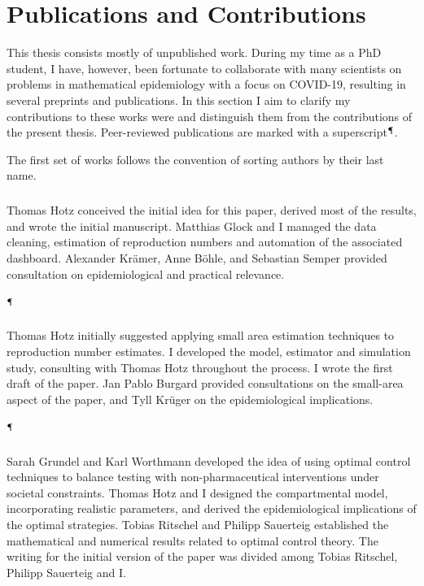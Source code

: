 
\chapter*{Publications and Contributions}
\begin{refsection}[ownpubs]
This thesis consists mostly of unpublished work. 
During my time as a PhD student, I have, however, been fortunate to collaborate with many scientists on problems in mathematical epidemiology with a focus on COVID-19, resulting in several preprints and publications.
In this section I aim to clarify my contributions to these works were and distinguish them from the contributions of the present thesis. Peer-reviewed publications are marked with a superscript$^{\mathparagraph}$.

The first set of works follows the convention of sorting authors by their last name.


\paragraph{\cite{Hotz2020Monitoring}}
Thomas Hotz conceived the initial idea for this paper, derived most of the results, and wrote the initial manuscript. Matthias Glock and I managed the data cleaning, estimation of reproduction numbers and automation of the associated dashboard. Alexander Krämer, Anne Böhle, and Sebastian Semper provided consultation on epidemiological and practical relevance. 

\paragraph{\cite{Burgard2021Regional}$^{\mathparagraph}$}
Thomas Hotz initially suggested applying small area estimation techniques to reproduction number estimates. I developed the model, estimator and simulation study, consulting with Thomas Hotz throughout the process. I wrote the first draft of the paper. Jan Pablo Burgard provided consultations on the small-area aspect of the paper, and Tyll Krüger on the epidemiological implications.

\paragraph{\cite{Grundel2022How}$^{\mathparagraph}$}
Sarah Grundel and Karl Worthmann developed the idea of using optimal control techniques to balance testing with non-pharmaceutical interventions under societal constraints.
Thomas Hotz and I designed the compartmental model, incorporating realistic parameters, and derived the epidemiological implications of the optimal strategies. 
Tobias Ritschel and Philipp Sauerteig established the mathematical and numerical results related to optimal control theory.
The writing for the initial version of the paper was divided among Tobias Ritschel, Philipp Sauerteig and I. 


\end{refsection}
